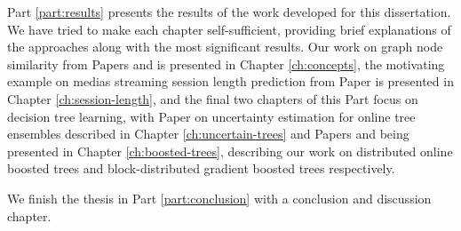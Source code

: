Part \ref{part:results} presents the results of the work developed for this
dissertation. We have tried to make each chapter self-sufficient, providing
brief explanations of the approaches along with the most significant results.
Our work on graph node similarity from Papers \conceptsicdmNum and \conceptskaisNum
is presented in Chapter \ref{ch:concepts},
the motivating example on medias streaming session length prediction from Paper \sessionlengthNum is presented in Chapter \ref{ch:session-length}, and the final
two chapters of this Part focus on decision tree learning, with Paper \uncertaintreesNum
on uncertainty estimation for online tree ensembles described in Chapter \ref{ch:uncertain-trees} and Papers \boostvhtNum and \blockgbtNum
being presented in Chapter \ref{ch:boosted-trees}, describing our work on distributed online boosted trees
and block-distributed gradient boosted trees respectively.

We finish the thesis in Part \ref{part:conclusion} with a conclusion and discussion
chapter.
